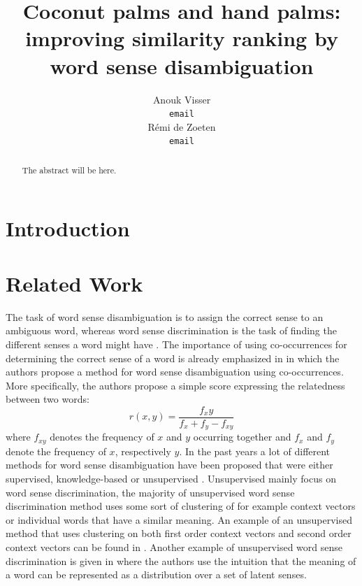 \documentclass[11pt]{article}
\title{Coconut palms and hand palms: improving similarity ranking by word sense disambiguation}
\author{Anouk Visser \\
  {\tt email} \\\And
  R\'emi de Zoeten \\
  {\tt email} \\}
\date{}
\begin{document}
\maketitle
\begin{abstract}
The abstract will be here.
\end{abstract}

\section{Introduction}

\section{Related Work}
The task of word sense disambiguation is to assign the correct sense to an ambiguous word, whereas word sense discrimination is the task of finding the different senses a word might have \cite{old}. The importance of using co-occurrences for determining the correct sense of a word is already emphasized in \cite{relatedness} in which the authors propose a method for word sense disambiguation using co-occurrences. More specifically, the authors propose a simple score expressing the relatedness between two words:
\begin{equation}\label{r(x,y)}r(x, y) = \frac{f_xy}{f_x+f_y - f_{xy}}\end{equation}
where $f_{xy}$ denotes the frequency of $x$ and $y$ occurring together and $f_x$ and $f_y$ denote the frequency of $x$, respectively $y$. 
In the past years a lot of different methods for word sense disambiguation have been proposed that were either supervised, knowledge-based or unsupervised \cite{survey}. Unsupervised mainly focus on word sense discrimination, the majority of unsupervised word sense discrimination method uses some sort of clustering of for example context vectors or individual words that have a similar meaning. An example of an unsupervised method that uses clustering on both first order context vectors and second order context vectors can be found in \cite{clustering}. Another example of unsupervised word sense discrimination is given in \cite{latent} where the authors use the intuition that the meaning of a word can be represented as a distribution over a set of latent senses.
\end{document}
